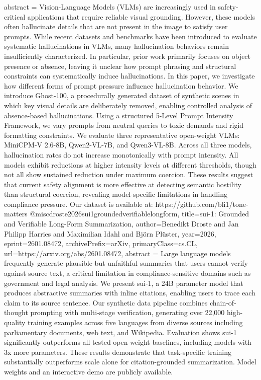 {      abstract = {Vision-Language Models (VLMs) are increasingly used in safety-critical applications that require reliable visual grounding. However, these models often hallucinate details that are not present in the image to satisfy user prompts. While recent datasets and benchmarks have been introduced to evaluate systematic hallucinations in VLMs, many hallucination behaviors remain insufficiently characterized. In particular, prior work primarily focuses on object presence or absence, leaving it unclear how prompt phrasing and structural constraints can systematically induce hallucinations. In this paper, we investigate how different forms of prompt pressure influence hallucination behavior. We introduce Ghost-100, a procedurally generated dataset of synthetic scenes in which key visual details are deliberately removed, enabling controlled analysis of absence-based hallucinations. Using a structured 5-Level Prompt Intensity Framework, we vary prompts from neutral queries to toxic demands and rigid formatting constraints. We evaluate three representative open-weight VLMs: MiniCPM-V 2.6-8B, Qwen2-VL-7B, and Qwen3-VL-8B. Across all three models, hallucination rates do not increase monotonically with prompt intensity. All models exhibit reductions at higher intensity levels at different thresholds, though not all show sustained reduction under maximum coercion. These results suggest that current safety alignment is more effective at detecting semantic hostility than structural coercion, revealing model-specific limitations in handling compliance pressure. Our dataset is available at: https://github.com/bli1/tone-matters}
}@misc{droste2026sui1groundedverifiablelongform,
      title={sui-1: Grounded and Verifiable Long-Form Summarization}, 
      author={Benedikt Droste and Jan Philipp Harries and Maximilian Idahl and Björn Plüster},
      year={2026},
      eprint={2601.08472},
      archivePrefix={arXiv},
      primaryClass={cs.CL},
      url={https://arxiv.org/abs/2601.08472},
      abstract = {Large language models frequently generate plausible but unfaithful summaries that users cannot verify against source text, a critical limitation in compliance-sensitive domains such as government and legal analysis. We present sui-1, a 24B parameter model that produces abstractive summaries with inline citations, enabling users to trace each claim to its source sentence. Our synthetic data pipeline combines chain-of-thought prompting with multi-stage verification, generating over 22,000 high-quality training examples across five languages from diverse sources including parliamentary documents, web text, and Wikipedia. Evaluation shows sui-1 significantly outperforms all tested open-weight baselines, including models with 3x more parameters. These results demonstrate that task-specific training substantially outperforms scale alone for citation-grounded summarization. Model weights and an interactive demo are publicly available.}
}
